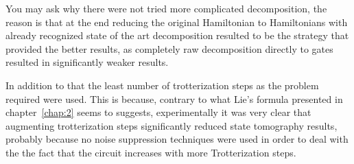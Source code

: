     You may ask why there were not tried more complicated decomposition, the reason is that at the end reducing the original Hamiltonian to Hamiltonians with already recognized state of the art decomposition resulted to be the strategy that provided the better results, as completely raw decomposition directly to gates resulted in significantly weaker results.

    In addition to that the least number of trotterization steps as the problem required were used. This is because, contrary to what Lie's formula presented in chapter~\ref{chap:2} seems to suggests, experimentally it was very clear that augmenting trotterization steps significantly reduced state tomography results, probably because no noise suppression techniques were used in order to deal with the the fact that the circuit increases with more Trotterization steps.
